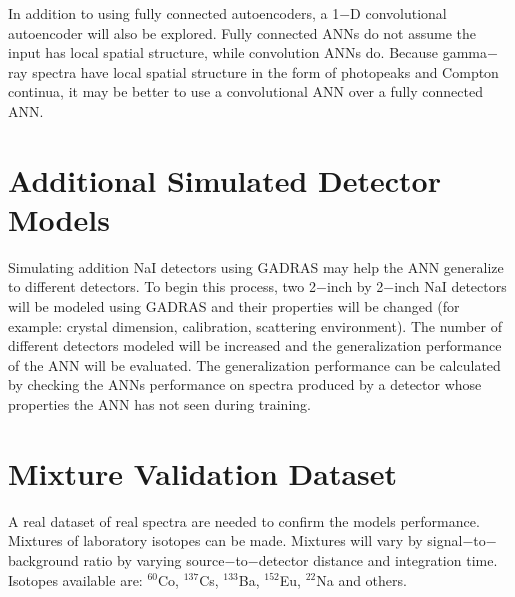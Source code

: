 \documentclass[tocnosub,noragright,centerchapter,12pt,fullpage]{uiucecethesis09}
\begin{document}
In addition to using fully connected autoencoders, a 1$-$D convolutional autoencoder will also be explored. Fully connected ANNs do not assume the input has local spatial structure, while convolution ANNs do. Because gamma$-$ray spectra have local spatial structure in the form of photopeaks and Compton continua, it may be better to use a convolutional ANN over a fully connected ANN.



\section{Additional Simulated Detector Models}

Simulating addition NaI detectors using GADRAS may help the ANN generalize to different detectors. To begin this process, two 2$-$inch by 2$-$inch NaI detectors will be modeled using GADRAS and their properties will be changed (for example: crystal dimension, calibration, scattering environment). The number of different detectors modeled will be increased and the generalization performance of the ANN will be evaluated. The generalization performance can be calculated by checking the ANNs performance on spectra produced by a detector whose properties the ANN has not seen during training.  

\section{Mixture Validation Dataset}

A real dataset of real spectra are needed to confirm the models performance. Mixtures of laboratory isotopes can be made. Mixtures will vary by signal$-$to$-$background ratio by varying source$-$to$-$detector distance and integration time. Isotopes available are: $^{60}$Co, $^{137}$Cs, $^{133}$Ba, $^{152}$Eu, $^{22}$Na and others. %
\end{document}
